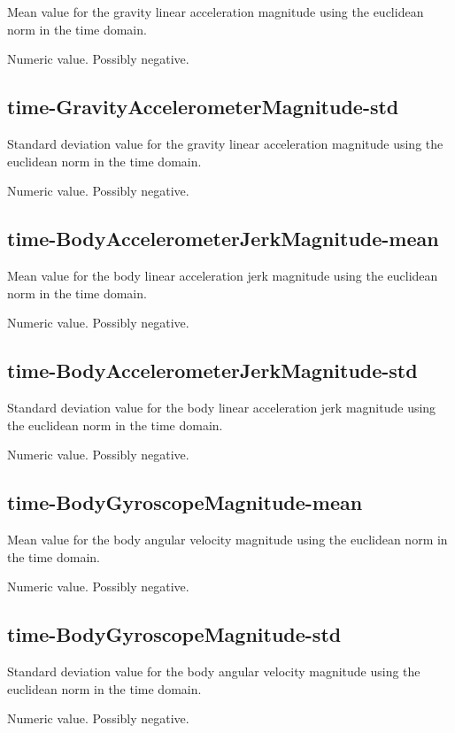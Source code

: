 \documentclass[a4paper,10pt]{report}
\begin{document}
Mean value for the gravity linear acceleration magnitude using the euclidean norm in the time domain.

Numeric value. Possibly negative.

\subsection*{time-GravityAccelerometerMagnitude-std} 

Standard deviation value for the gravity linear acceleration magnitude using the euclidean norm in the time domain.

Numeric value. Possibly negative.

\subsection*{time-BodyAccelerometerJerkMagnitude-mean} 

Mean value for the body linear acceleration jerk magnitude using the euclidean norm in the time domain.

Numeric value. Possibly negative.

\subsection*{time-BodyAccelerometerJerkMagnitude-std} 

Standard deviation value for the body linear acceleration jerk magnitude using the euclidean norm in the time domain.

Numeric value. Possibly negative.

\subsection*{time-BodyGyroscopeMagnitude-mean} 

Mean value for the body angular velocity magnitude using the euclidean norm in the time domain.

Numeric value. Possibly negative.

\subsection*{time-BodyGyroscopeMagnitude-std} 

Standard deviation value for the body angular velocity magnitude using the euclidean norm in the time domain.

Numeric value. Possibly negative.
\end{document}
